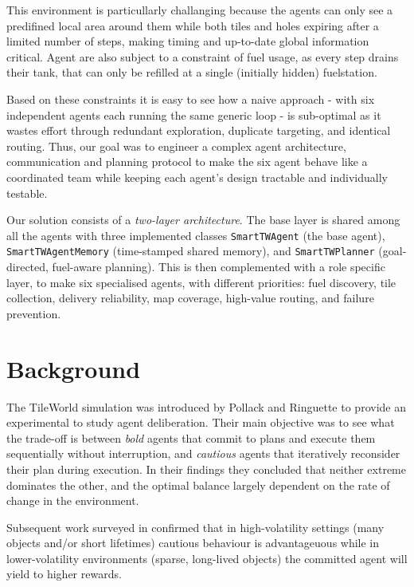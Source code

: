 \documentclass[letterpaper]{article}
\begin{document}
This environment is particullarly challanging because the agents can only see a  predifined local
 area around them while both tiles and holes expiring after a limited number of steps, making timing 
 and up-to-date global information critical. Agent are also subject to a constraint of fuel usage, 
 as every step drains their tank, that can only be refilled at a single (initially hidden) fuelstation. 

Based on these constraints it is easy to see how a naive approach - with six independent agents each 
running the same generic loop - is sub-optimal as it wastes effort through redundant exploration, duplicate 
targeting, and identical routing. Thus, our goal was to engineer a complex agent architecture, communication
 and planning protocol to make the six agent behave like a coordinated team while keeping each agent's 
 design tractable and individually testable.

Our solution consists of a \emph{two-layer architecture}. The base layer is shared among all the agents 
with three implemented classes \texttt{SmartTWAgent} (the base agent), \texttt{SmartTWAgentMemory} 
(time-stamped shared memory), and \texttt{SmartTWPlanner} (goal-directed, fuel-aware planning). 
This is then complemented with a role specific layer, to make six specialised agents, with different 
priorities: fuel discovery, tile collection, delivery reliability, map coverage, high-value routing, 
and failure prevention.


\section{Background}

The TileWorld simulation was introduced by Pollack and Ringuette  
to provide an experimental to study agent deliberation. Their main objective was to see 
what the trade-off is between \emph{bold} agents that commit to plans and execute them 
sequentially without interruption, and \emph{cautious} agents that iteratively reconsider 
their plan during execution. In their findings they concluded that neither extreme dominates 
the other, and the optimal balance largely dependent on the rate of change in the environment. 

Subsequent work surveyed in \cite{kinny1993} confirmed that in high-volatility settings 
(many objects and/or short lifetimes) cautious behaviour is advantageuous while in lower-volatility 
environments (sparse, long-lived objects) the committed agent will yield to higher rewards.
\end{document}
